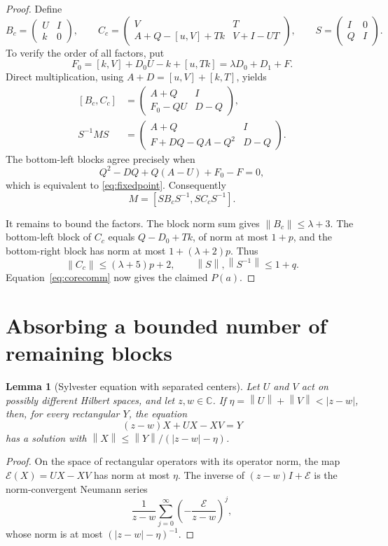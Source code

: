 \documentclass[11pt]{article}
\newtheorem{lemma}[theorem]{Lemma}
\theoremstyle{remark}
\newcommand{\C}{\mathbb C}
\newcommand{\norm}[1]{\left\lVert#1\right\rVert}
\newcommand{\comm}[2]{[#1,#2]}
\numberwithin{equation}{section}
\begin{document}
\begin{proof}
Define
\begin{equation}\label{eq:companions}
 B_c=\begin{pmatrix}U&I\\k&0\end{pmatrix},\qquad
 C_c=\begin{pmatrix}
 V&T\\ A+Q-\comm uV+Tk&V+I-UT
 \end{pmatrix},\qquad
 S=\begin{pmatrix}I&0\\Q&I\end{pmatrix}.
\end{equation}
To verify the order of all factors, put
\[
 F_0=\comm kV+D_0U-k+\comm u{Tk}
     =\lambda D_0+D_1+F.
\]
Direct multiplication, using $A+D=\comm uV+\comm kT$, yields
\begin{equation}\label{eq:fourblocks}
\begin{aligned}
 \comm{B_c}{C_c}
  &=\begin{pmatrix}A+Q&I\\F_0-QU&D-Q\end{pmatrix},\\
 S^{-1}MS
  &=\begin{pmatrix}A+Q&I\\F+DQ-QA-Q^2&D-Q\end{pmatrix}.
\end{aligned}
\end{equation}
The bottom-left blocks agree precisely when
\[
 Q^2-DQ+Q(A-U)+F_0-F=0,
\]
which is equivalent to \eqref{eq:fixedpoint}. Consequently
\begin{equation}\label{eq:corecomm}
 M=\comm{SB_cS^{-1}}{SC_cS^{-1}}.
\end{equation}

It remains to bound the factors. The block norm sum gives
$\norm{B_c}\le\lambda+3$. The bottom-left block of $C_c$ equals $Q-D_0+Tk$,
of norm at most $1+p$, and the bottom-right block has norm at most
$1+(\lambda+2)p$. Thus
\[
 \norm{C_c}\le(\lambda+5)p+2,\qquad
 \norm S,\norm{S^{-1}}\le1+q.
\]
Equation~\eqref{eq:corecomm} now gives the claimed $P(a)$.
\end{proof}

\section{Absorbing a bounded number of remaining blocks}\label{sec:shears}
\begin{lemma}[Sylvester equation with separated centers]\label{lem:sylvester}
Let $U$ and $V$ act on possibly different Hilbert spaces, and let $z,w\in\C$.
If $\eta=\norm U+\norm V<|z-w|$, then, for every rectangular $Y$, the equation
\[
 (z-w)X+UX-XV=Y
\]
has a solution with
$\norm X\le\norm Y/(|z-w|-\eta)$.
\end{lemma}
\begin{proof}
On the space of rectangular operators with its operator norm, the map
$\mathcal E(X)=UX-XV$ has norm at most $\eta$. The inverse of
$(z-w)I+\mathcal E$ is the norm-convergent Neumann series
\[
 \frac1{z-w}\sum_{j=0}^\infty
       \left(-\frac{\mathcal E}{z-w}\right)^j,
\]
whose norm is at most $(|z-w|-\eta)^{-1}$.
\end{proof}
\end{document}
